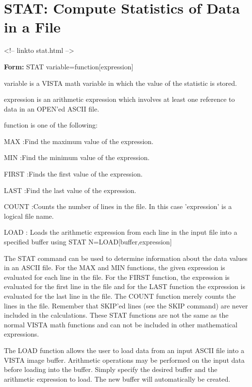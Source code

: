 \section{STAT: Compute Statistics of Data in a File}
\begin{rawhtml}
<!-- linkto stat.html -->
\end{rawhtml}
\begin{command}
  \item[\textbf{Form: } STAT variable=function{[expression]}\hfill]{}
  \item[variable]{is a VISTA math variable in which the
       value of the statistic is stored.}
  \item[expression]{is an arithmetic expression which involves
       at least one reference to data in an OPEN'ed ASCII file.}
  \item[function]{is one of the following:}
  \item{MAX :Find the maximum value of the expression.}
  \item{MIN :Find the minimum value of the expression.}
  \item{FIRST :Finds the first value of the expression.}
  \item{LAST :Find the last value of the expression.}
  \item{COUNT :Counts the number of lines in the file.
        In this case 'expression' is a logical file name.}
  \item{LOAD   :  Loads the arithmetic expression from each
       line in the input file into a specified buffer
       using STAT N=LOAD{[buffer,expression]}}
\end{command}

The STAT command can be used to determine information about the data values
in an ASCII file.  For the MAX and MIN functions, the given expression is
evaluated for each line in the file.  For the FIRST function, the
expression is evaluated for the first line in the file and for the LAST
function the expression is evaluated for the last line in the file.  The
COUNT function merely counts the lines in the file. Remember that SKIP'ed
lines (see the SKIP command) are never included in the calculations.  These
STAT functions are not the same as the normal VISTA math functions and can
not be included in other mathematical expressions.

The LOAD function allows the user to load data from an input ASCII file
into a VISTA image buffer. Arithmetic operations may be performed on the
input data before loading into the buffer. Simply specify the desired
buffer and the arithmetic expression to load. The new buffer will
automatically be created.

